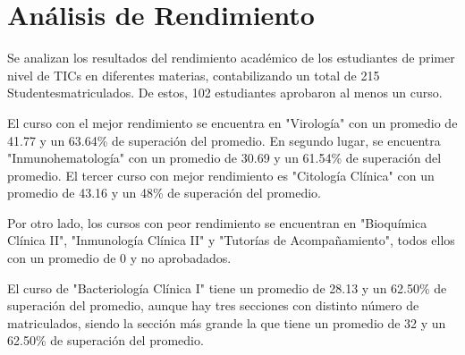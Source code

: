 \vspace{1cm}
\section{Análisis de Rendimiento}
Se analizan los resultados del rendimiento académico de los estudiantes de primer nivel de TICs en diferentes materias, contabilizando un total de 215 Studentesmatriculados. De estos, 102 estudiantes aprobaron al menos un curso.

El curso con el mejor rendimiento se encuentra en "Virología" con un promedio de 41.77 y un 63.64\% de superación del promedio. En segundo lugar, se encuentra "Inmunohematología" con un promedio de 30.69 y un 61.54\% de superación del promedio. El tercer curso con mejor rendimiento es "Citología Clínica" con un promedio de 43.16 y un 48\% de superación del promedio.

Por otro lado, los cursos con peor rendimiento se encuentran en "Bioquímica Clínica II", "Inmunología Clínica II" y "Tutorías de Acompañamiento", todos ellos con un promedio de 0 y no aprobadados.

El curso de "Bacteriología Clínica I" tiene un promedio de 28.13 y un 62.50\% de superación del promedio, aunque hay tres secciones con distinto número de matriculados, siendo la sección más grande la que tiene un promedio de 32 y un 62.50\% de superación del promedio.

